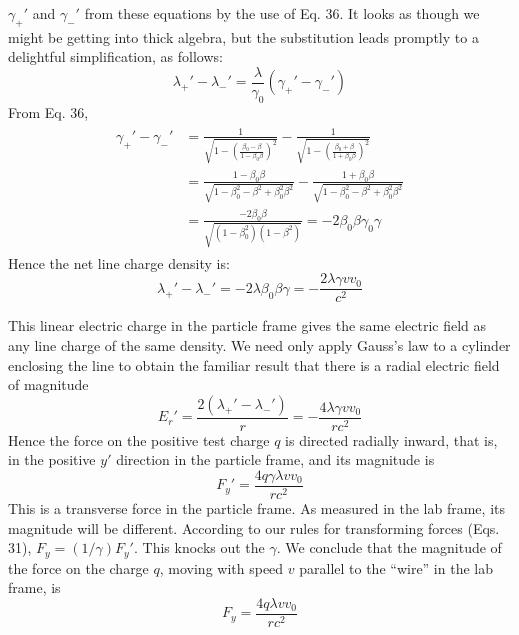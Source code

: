 $\gamma_+'$ and $\gamma_-'$ from these equations by the use of Eq. 36. It looks as
though we might be getting into thick algebra, but the substitution
leads promptly to a delightful simplification, as follows:
\begin{equation}
  \lambda_+'-\lambda_-' = \frac{\lambda}{\gamma_0}(\gamma_+'-\gamma_-')
\end{equation}
From Eq. 36,
\begin{align}
\begin{split}
  \gamma_+'-\gamma_-'
    &= \frac{1}{\sqrt{1-\left(\frac{\beta_0-\beta}{1-\beta_0\beta}\right)^2}}
      -\frac{1}{\sqrt{1-\left(\frac{\beta_0+\beta}{1+\beta_0\beta}\right)^2}} \\
    &= \frac{1-\beta_0\beta}{\sqrt{1-\beta_0^2-\beta^2+\beta_0^2\beta^2}}
      -\frac{1+\beta_0\beta}{\sqrt{1-\beta_0^2-\beta^2+\beta_0^2\beta^2}} \\
    &= \frac{-2\beta_0\beta}{\sqrt{(1-\beta_0^2)(1-\beta^2)}} = -2\beta_0\beta\gamma_0\gamma
\end{split}
\end{align}
Hence the net line charge density is:
\begin{equation}
  \lambda_+'-\lambda_-' = -2\lambda\beta_0\beta\gamma = -\frac{2\lambda\gamma v v_0}{c^2}
\end{equation}

This linear electric charge in the particle frame gives the same electric
field as any line charge of the same density. We need only apply
Gauss's law to a cylinder enclosing the line to obtain the familiar
result that there is a radial electric field of magnitude
\begin{equation}
  E_r' = \frac{2(\lambda_+'-\lambda_-')}{r} = -\frac{4\lambda\gamma v v_0}{rc^2}
\end{equation}
Hence the force on the positive test charge $q$ is directed radially inward,
that is, in the positive $y'$ direction in the particle frame, and its
magnitude is
\begin{equation}
  F_y' = \frac{4q\gamma\lambda v v_0}{rc^2}
\end{equation}
This is a transverse force in the particle frame. As measured in the
lab frame, its magnitude will be different. According to our rules
for transforming forces (Eqs. 31), $F_y=(1/\gamma)F_y'$. This knocks out
the $\gamma$. We conclude that the magnitude of the force on the charge $q$,
moving with speed $v$ parallel to the ``wire'' in the lab frame, is
\begin{equation}
  F_y = \frac{4q\lambda v v_0}{rc^2}
\end{equation}

